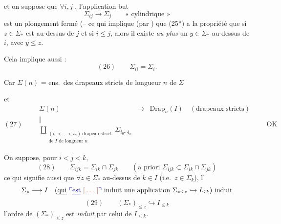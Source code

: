 \documentclass[11pt,a4paper]{article}
\begin{document}
 et on \struck{\ill{}} suppose que $\forall i,j$ , l'application but
\[
\Sigma_{ij}\longrightarrow\Sigma_j\qquad\text{« cylindrique »}
\]
est un  plongement fermé (-- ce qui implique (par ) que (25*) a la propriété que si $z\in\Sigma_{*}$ est au-dessus de $j$ et si $i\le j$, alors il existe \emph{au plus} un $y\in\Sigma_{*}$ au-dessus de $i$, avec $y\le z$.

Cela implique aussi :
\[
(26)\qquad \Sigma_{ii}=\Sigma_i .
\]

 Car   $\Sigma(n)$ = ens.\ des drapeaux stricts de longueur $n$ de $\Sigma$ 

et
\[
(27)\qquad
\begin{array}{ccc}
\Sigma(n) & \longrightarrow & \mathrm{Drap}_n(I)\quad(\text{drapeaux stricts})\\
\Vert & & \\
\displaystyle\coprod_{\substack{(i_0<\cdots<i_n)\ \text{drapeau strict}\\ \text{de } I \text{ de longueur } n}}\Sigma_{i_0\cdots i_n} & &
\end{array}
\qquad\text{OK}
\]


 On suppose, pour $i<j<k$,
\[
(28)\qquad \Sigma_{ijk}=\Sigma_{ik}\cap\Sigma_{jk}\qquad(\text{a priori } \Sigma_{ijk}\subset\Sigma_{ik}\cap\Sigma_{jk})
\]
ce qui signifie aussi que $\forall z\in\Sigma_{*}$ au-dessus de $k\in I$ (i.e.\ $z\in\Sigma_k$), l'
\[
\Sigma_{*}\longrightarrow I\quad(\text{\uncertain{qui} \add{\uncertain{est} \ill{}} induit une application } \Sigma_{*\le z}\hookrightarrow I_{\le k})\ \text{induit}
\]
\[
(29)\qquad (\Sigma_{*})_{\le z}\hookrightarrow I_{\le k}
\]
l'ordre de $(\Sigma_{*})_{\le z}$ est \emph{induit} par celui de $I_{\le k}$.

\end{document}
